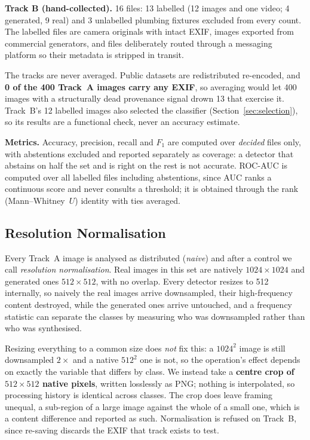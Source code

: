 \documentclass[conference]{IEEEtran}
\begin{document}
\textbf{Track B (hand-collected).} 16 files: 13 labelled (12 images and one
video; 4 generated, 9 real) and 3 unlabelled plumbing fixtures excluded from
every count. The labelled files are camera originals with intact EXIF, images
exported from commercial generators, and files deliberately routed through a
messaging platform so their metadata is stripped in transit.

The tracks are never averaged. Public datasets are redistributed re-encoded,
and \textbf{0 of the 400 Track~A images carry any EXIF}, so averaging would let
400 images with a structurally dead provenance signal drown 13 that exercise
it. Track~B's 12 labelled images also selected the classifier
(Section~\ref{sec:selection}), so its results are a functional check, never an
accuracy estimate.

\textbf{Metrics.} Accuracy, precision, recall and $F_1$ are computed over
\emph{decided} files only, with abstentions excluded and reported separately as
coverage: a detector that abstains on half the set and is right on the rest is
not accurate. ROC-AUC is computed over all labelled files including
abstentions, since AUC ranks a continuous score and never consults a threshold;
it is obtained through the rank (Mann--Whitney~$U$) identity with ties
averaged.

\subsection{Resolution Normalisation}
\label{sec:normal}

Every Track~A image is analysed as distributed (\emph{naive}) and after a
control we call \emph{resolution normalisation}. Real images in this set are
natively $1024\times1024$ and generated ones $512\times512$, with no overlap.
Every detector resizes to 512 internally, so naively the real images arrive
downsampled, their high-frequency content destroyed, while the generated ones
arrive untouched, and a frequency statistic can separate the classes by
measuring who was downsampled rather than who was synthesised.

Resizing everything to a common size does \emph{not} fix this: a $1024^2$ image
is still downsampled $2\times$ and a native $512^2$ one is not, so the
operation's effect depends on exactly the variable that differs by class. We
instead take a \textbf{centre crop of $512\times512$ native pixels}, written
losslessly as PNG; nothing is interpolated, so processing history is identical
across classes. The crop does leave framing unequal, a sub-region of a large
image against the whole of a small one, which is a content difference and
reported as such. Normalisation is refused on Track~B, since re-saving
discards the EXIF that track exists to test.
\end{document}
